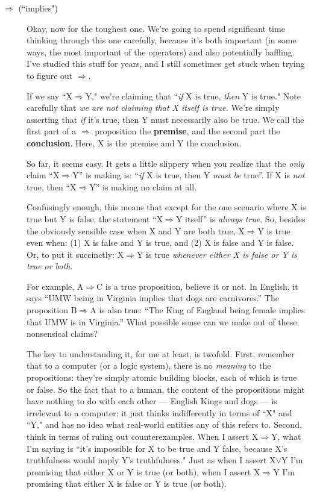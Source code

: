 \begin{description}
\item[$\Rightarrow$ (``implies")] Okay, now for the toughest one. We're
going to spend significant time thinking through this one carefully,
because it's both important (in some ways, the most important of the
operators) and also potentially baffling. I've studied this stuff for
years, and I still sometimes get stuck when trying to figure out
$\Rightarrow$.

If we say ``X$\Rightarrow$Y," we're claiming that ``\textit{if} X is true,
\textit{then} Y is true." Note carefully that \textit{we are not claiming
that X itself is true.} We're simply asserting that \textit{if} it's true,
then Y must necessarily also be true. We call the first part of a
$\Rightarrow$ proposition the \textbf{premise}, and the second part the
\textbf{conclusion}. Here, X is the premise and Y the conclusion.

So far, it seems easy. It gets a little slippery when you realize that the
\textit{only} claim ``X$\Rightarrow$Y'' is making is: ``\textit{if} X is true,
then Y \textit{must be} true''. If X is \textit{not} true, then
``X$\Rightarrow$Y'' is making no claim at all.

Confusingly enough, this means that except for the one scenario where X is true
but Y is false, the statement ``X$\Rightarrow$Y itself'' is \textit{always
true}. So, besides the obviously sensible case when X and Y are both true,
X$\Rightarrow$Y is true even when: (1) X is false and Y is true, and (2) X is
false and Y is false. Or, to put it succinctly: X$\Rightarrow$Y is true
\textit{whenever either X is false or Y is true or both.}

For example, A$\Rightarrow$C is a true proposition, believe it or not. In
English, it says ``UMW being in Virginia implies that dogs are carnivores.''
The proposition B$\Rightarrow$A is also true: ``The King of England being
female implies that UMW is in Virginia.'' What possible sense can we make out
of these nonsensical claims?

The key to understanding it, for me at least, is twofold. First, remember
that to a computer (or a logic system), there is no \textit{meaning} to the
propositions: they're simply atomic building blocks, each of which is true
or false. So the fact that to a human, the content of the propositions
might have nothing to do with each other --- English Kings and dogs --- is
irrelevant to a computer: it just thinks indifferently in terms of ``X" and
``Y," and has no idea what real-world entities any of this refers to.
Second, think in terms of ruling out counterexamples. When I assert
X$\Rightarrow$Y, what I'm saying is ``it's impossible for X to be true
and Y false, because X's truthfulness would imply Y's truthfulness." Just
as when I assert X$\vee$Y I'm promising that either X or Y is true (or
both), when I assert X$\Rightarrow$Y I'm promising that either X is false
or Y is true (or both).


\end{description}

